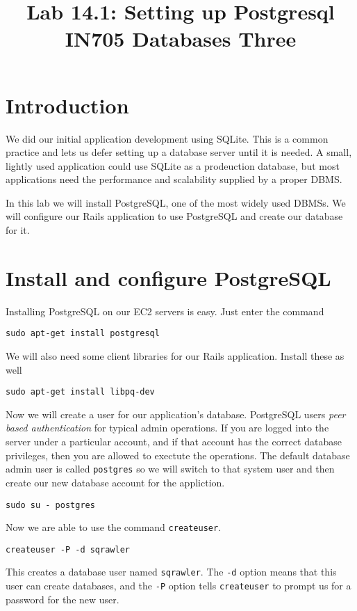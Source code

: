 \documentclass{article}
\begin{document}
\title{Lab 14.1: Setting up Postgresql\\ IN705 Databases Three}
\date{}
\maketitle

\section*{Introduction}
We did our initial application development using SQLite.  This is a common practice and lets us 
defer setting up a database server until it is needed.  A small, lightly used application could use
SQLite as a prodeuction database, but most applications need the performance and scalability 
supplied by a proper DBMS.

In this lab we will install PostgreSQL, one of the most widely used DBMSs.  We will configure our 
Rails application to use PostgreSQL and create our database for it.

\section{Install and configure PostgreSQL}
Installing PostgreSQL on our EC2 servers is easy.  Just enter the command

\texttt{sudo apt-get install postgresql}

We will also need some client libraries for our Rails application.  Install these as well

\texttt{sudo apt-get install libpq-dev}

Now we will create a user for our application's database.  PostgreSQL users \emph{peer based authentication} for typical admin operations.  If you are logged into the server under a particular account, and if that account has the correct database privileges, then you are allowed to exectute the operations.  The 
default database admin user is called \texttt{postgres} so we will switch to that system user and then
create our new database account for the appliction.

\texttt{sudo su - postgres}

Now we are able to use the command \texttt{createuser}.

\texttt{createuser -P -d sqrawler}

This creates a database user named \texttt{sqrawler}. The \texttt{-d} option means that this user can create databases, and the \texttt{-P} option tells \texttt{createuser} to prompt us for a password for the new user.
\end{document}

